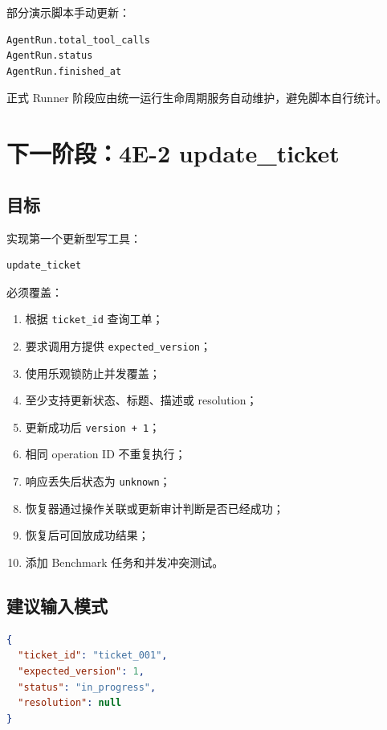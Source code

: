 \documentclass[11pt,a4paper]{ctexart}
\begin{document}
部分演示脚本手动更新：

\begin{lstlisting}
AgentRun.total_tool_calls
AgentRun.status
AgentRun.finished_at
\end{lstlisting}

正式 Runner 阶段应由统一运行生命周期服务自动维护，避免脚本自行统计。

\section{下一阶段：4E-2 update\_ticket}

\subsection{目标}

实现第一个更新型写工具：

\begin{lstlisting}
update_ticket
\end{lstlisting}

必须覆盖：

\begin{enumerate}[leftmargin=2.2em]
  \item 根据 \texttt{ticket\_id} 查询工单；
  \item 要求调用方提供 \texttt{expected\_version}；
  \item 使用乐观锁防止并发覆盖；
  \item 至少支持更新状态、标题、描述或 resolution；
  \item 更新成功后 \texttt{version + 1}；
  \item 相同 operation ID 不重复执行；
  \item 响应丢失后状态为 \texttt{unknown}；
  \item 恢复器通过操作关联或更新审计判断是否已经成功；
  \item 恢复后可回放成功结果；
  \item 添加 Benchmark 任务和并发冲突测试。
\end{enumerate}

\subsection{建议输入模式}

\begin{lstlisting}[language=JSON]
{
  "ticket_id": "ticket_001",
  "expected_version": 1,
  "status": "in_progress",
  "resolution": null
}
\end{lstlisting}
\end{document}
